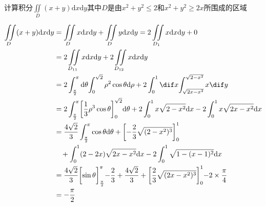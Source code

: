 \documentclass[color=green,titlestyle=hang]{elegantbook}%
\begin{document}
\begin{exercise} 计算积分$\displaystyle \iint\limits_{D}(x+y)\mathrm{d}x\mathrm{d}y$其中$D$是由$x^2+y^2\leqslant2$和$x^2+y^2\geqslant 2x$所围成的区域 \end{exercise}
\begin{Solution} 
\begin{align*}
\iint\limits_{D}(x+y)\mathrm{d}x\mathrm{d}y&=\iint\limits_{D}x\mathrm{d}x\mathrm{d}y+\iint\limits_{D}y\mathrm{d}x\mathrm{d}y=2\iint\limits_{D_1}x\mathrm{d}x\mathrm{d}y+0\\
&=2\iint\limits_{D_{11}}x\mathrm{d}x\mathrm{d}y+2\iint\limits_{D_{12}}x\mathrm{d}x\mathrm{d}y\\
&=2\int_{\frac{\pi}{2}}^{\pi}\mathrm{d}\theta\!\int_{0}^{\sqrt{2}}{\rho}^2\cos \theta\mathrm{d}\rho+2\int_{0}^{1}\dif x\!\int_{\sqrt{2x-x^2}}^{\sqrt{2-x^2}}x\dif y\\
&=2\int_{\frac{\pi}{2}}^{\pi}\biggl [\frac{1}{3}{\rho}^3\cos\theta\biggl ]_{0}^{\sqrt{2}}\mathrm{d}\theta+2\int_{0}^{1}x\sqrt{2-x^2}\mathrm{d}x-2\int_{0}^{1}x\sqrt{2x-x^2}\mathrm{d}x\\
&=\frac{4\sqrt{2}}{3}\int_{\frac{\pi}{2}}^{\pi}\cos\theta \mathrm{d}\theta+\biggl [-\frac{2}{3}\sqrt{(2-x^2)^3}\biggl ]_{0}^{1}\\
&\phantom{=\,}+\int_{0}^{1}(2-2x)\sqrt{2x-x^2}\mathrm{d}x-2\int_0^1\sqrt{1-(x-1)^2}\mathrm{d}x\\
&=\frac{4\sqrt{2}}{3}\biggl[\sin\theta\biggl]_{\frac{\pi}{2}}^{\pi}-\frac{2}{3}+\frac{4\sqrt{2}}{3}+\biggl[\frac{2}{3}\sqrt{(2x-x^2)^3}\biggl]_0^1-2\times\frac{\pi}{4}\\
&=-\frac{\pi}{2}
\end{align*}
\end{Solution}	
\end{document}
